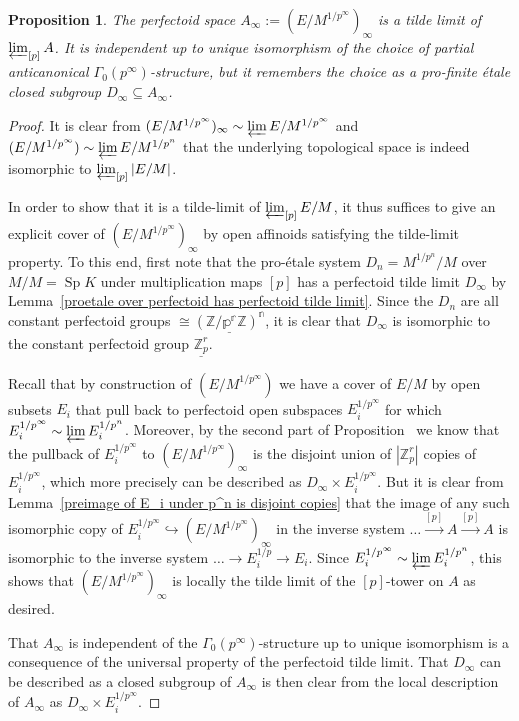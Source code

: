 \documentclass[11pt,oneside]{amsart}
\newtheorem{proposition}[theorem]{Proposition}
\theoremstyle{definition}
\theoremstyle{remark}
\begin{document}
	\begin{proposition}\label{tilde limit of tilde limits of partial towers is tilde limit of whole tower}
		The perfectoid space  $A_\infty:=(E/M^{1/p^\infty})_\infty$ is a tilde limit of $\varprojlim_{[p]}A$.	It is independent up to unique isomorphism of the choice of partial anticanonical $\Gamma_0(p^\infty)$-structure, but it remembers the choice as a pro-finite \'etale closed subgroup $D_\infty \subseteq A_\infty$. 
	\end{proposition}
	\begin{proof}
	It is clear from $(E/M^{1/p^\infty})_\infty \sim \varprojlim E/M^{1/p^\infty}$ and $(E/M^{1/p^\infty})\sim \varprojlim E/M^{1/p^n}$ that the underlying topological space is indeed isomorphic to $\varprojlim_{[p]}|E/M|$.

	In order to show that it is a tilde-limit of $\varprojlim_{[p]}E/M$, it thus suffices to give an explicit cover of $(E/M^{1/p^\infty})_\infty$ by open affinoids satisfying the tilde-limit property. To this end,
	first note that the pro-\'etale system $D_n=M^{1/p^n}/M$ over $M/M=\operatorname{Sp}K$ under multiplication maps $[p]$ has a perfectoid tilde limit $D_\infty$ by Lemma~\ref{proetale over perfectoid has perfectoid tilde limit}. Since the $D_n$ are all constant perfectoid groups $\cong \mathbb \underline{(\mathbb Z/p^r\mathbb Z)^n}$, it is clear that $D_\infty$ is isomorphic to the constant perfectoid group $\underline{\mathbb Z_p^r}$.
	
	Recall that by construction of $(E/M^{1/p^\infty})$ we have a cover of $E/M$ by open subsets $E_i$ that pull back to perfectoid open subspaces $E_i^{1/p^\infty}$ for which $E_i^{1/p^\infty}\sim \varprojlim E_i^{1/p^n}$. Moreover, by the second part of Proposition~\label{horizontal etale map pulls back to vertical limit} we know that the pullback of $E_i^{1/p^\infty}$ to $(E/M^{1/p^\infty})_\infty$ is the disjoint union of $|\mathbb Z_p^r|$ copies of $E_i^{1/p^\infty}$, which more precisely can be described as $D_\infty \times E_i^{1/p^\infty}$. But it is clear from Lemma~\ref{preimage of E_i under p^n is disjoint copies} that the image of any such isomorphic copy of $E_i^{1/p^\infty}\hookrightarrow   (E/M^{1/p^\infty})_\infty$ in the inverse system $\dots\xrightarrow{[p]}A\xrightarrow{[p]} A$ is isomorphic to the inverse system $\dots\rightarrow E_i^{1/p}\rightarrow E_i$. Since $E_i^{1/p^\infty}\sim \varprojlim E_i^{1/p^n}$, this shows that $(E/M^{1/p^\infty})_\infty$ is locally the tilde limit of the $[p]$-tower on $A$ as desired.
	
	That $A_\infty$ is independent of the $\Gamma_0(p^\infty)$-structure up to unique isomorphism is a consequence of the universal property of the perfectoid tilde limit. That $D_\infty$ can be described as a closed subgroup of $A_\infty$ is then clear from the local description of $A_\infty$ as $D_\infty \times E_i^{1/p^\infty}$.
	\end{proof}
	
\end{document}
